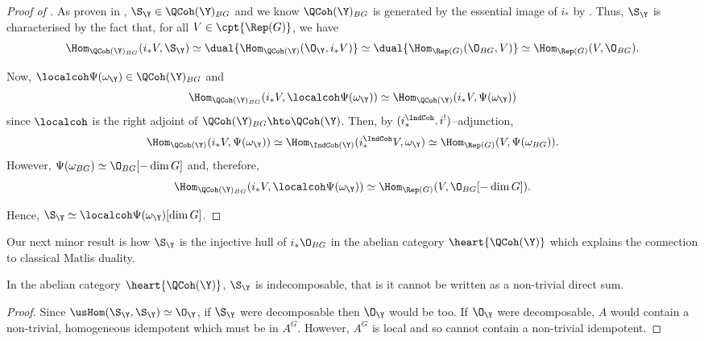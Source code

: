 \documentclass{amsart}
\begin{document}
  \begin{proof}[Proof of ]
    As proven in , \(\S_\Y \in \QCoh(\Y)_{BG}\)
    and we know \(\QCoh(\Y)_{BG}\) is generated by the essential image
    of \(i_\ast\) by .
    Thus, \(\S_\Y\) is characterised by the fact that, for all \(V \in \cpt{\Rep(G)}\),
    we have
    \begin{displaymath}
      \Hom_{\QCoh(\Y)_{BG}}(i_\ast V, \S_\Y) \simeq \dual{\Hom_{\QCoh(\Y)}(\O_\Y, i_\ast V)}
      \simeq \dual{\Hom_{\Rep(G)}(\O_{BG}, V)} \simeq \Hom_{\Rep(G)}(V, \O_{BG}).
    \end{displaymath}

    Now, \(\localcoh \Psi(\omega_\Y) \in \QCoh(\Y)_{BG}\) and
    \begin{displaymath}
      \Hom_{\QCoh(\Y)_{BG}}(i_\ast V, \localcoh \Psi(\omega_\Y)) \simeq \Hom_{\QCoh(\Y)}(i_\ast V, \Psi(\omega_\Y))
    \end{displaymath}
    since \(\localcoh\) is the right adjoint of \(\QCoh(\Y)_{BG} \hto \QCoh(\Y)\).
    Then, by \((i^{\IndCoh}_\ast, i^!)\)--adjunction,
    \begin{displaymath}
      \Hom_{\QCoh(\Y)}(i_\ast V, \Psi(\omega_\Y)) \simeq \Hom_{\IndCoh(\Y)}(i^{\IndCoh}_\ast V, \omega_\Y) \simeq \Hom_{\Rep(G)}(V, \Psi(\omega_{BG})).
    \end{displaymath}
    However, \(\Psi(\omega_{BG}) \simeq \O_{BG}[-\dim G]\) and, therefore,
    \begin{displaymath}
      \Hom_{\QCoh(\Y)_{BG}}(i_\ast V, \localcoh \Psi(\omega_\Y)) \simeq \Hom_{\Rep(G)}(V, \O_{BG}[-\dim G]).
    \end{displaymath}

    Hence, \(\S_\Y \simeq \localcoh \Psi(\omega_\Y)[\dim G]\).
  \end{proof}

  \sssec{}

  Our next minor result is how \(\S_\Y\) is the
  injective hull of \(i_\ast \O_{BG}\) in the abelian
  category \(\heart{\QCoh(\Y)}\) which explains
  the connection to classical Matlis duality.

  \begin{prop}
    In the abelian category \(\heart{\QCoh(\Y)}\), \(\S_\Y\)
    is indecomposable, that is it cannot be written as a non-trivial
    direct sum.
  \end{prop}
  \begin{proof}
    Since \(\usHom(\S_\Y, \S_\Y) \simeq \O_\Y\), if \(\S_\Y\)
    were decomposable then \(\O_\Y\) would be too. If \(\O_\Y\)
    were decomposable, \(A\) would contain a non-trivial,
    homogeneous idempotent
    which must be in \(A^G\). However, \(A^G\) is local and
    so cannot contain a non-trivial idempotent.
  \end{proof}
\end{document}
